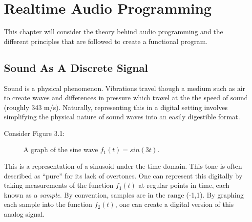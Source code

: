 \chapter{Realtime Audio Programming}
\hspace*{-0.12cm}This chapter will consider the theory behind audio programming and the different principles that are followed to create a functional program.
\section{Sound As A Discrete Signal}
Sound is a physical phenomenon. Vibrations travel though a medium such as air to create waves and differences in pressure which travel at the the speed of sound (roughly 343 m/s). Naturally, representing this in a digital setting involves simplifying the physical nature of sound waves into an easily digestible format.

Consider Figure 3.1:

\begin{figure}[h] %
\begin{center}
	\caption{A graph of the sine wave \(f_1(t) = sin(3t)\).}
\end{center}
\end{figure}

This is a representation of a sinusoid under the time domain. This tone is often described as ``pure'' for its lack of overtones. One can represent this digitally by taking measurements of the function \(f_1(t)\) at regular points in time, each known as a \textit{sample}. By convention, samples are in the range (-1,1). By graphing each sample into the function \(f_2(t)\), one can create a digital version of this analog signal.


